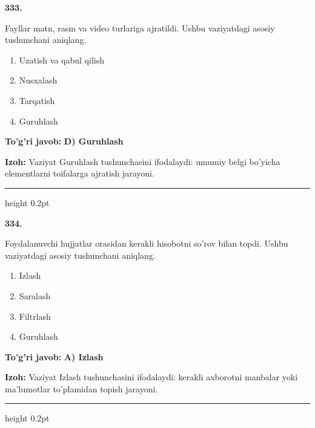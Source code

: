 \documentclass[10pt,a4paper,oneside]{article}
\begin{document}
\noindent\textbf{\color{ink}333.}
\par
Fayllar matn, rasm va video turlariga ajratildi. Ushbu vaziyatdagi asosiy tushunchani aniqlang.
\begin{enumerate}[label=\Alph*),leftmargin=9mm]
\item Uzatish va qabul qilish
\item Nusxalash
\item Tarqatish
\item Guruhlash
\end{enumerate}
\begin{tcolorbox}[enhanced,breakable,colback=teal!4,colframe=teal!50!black,boxrule=0.5pt,arc=1.1mm,left=3mm,right=3mm,top=1.7mm,bottom=1.7mm,before skip=2mm,after skip=2mm]
\textbf{\color{teal}To'g'ri javob:} \textbf{D) Guruhlash}
\par\smallskip
\textbf{Izoh:} Vaziyat Guruhlash tushunchasini ifodalaydi: umumiy belgi bo'yicha elementlarni toifalarga ajratish jarayoni.
\end{tcolorbox}
\vspace{2mm}\hrule height 0.2pt \vspace{3mm}

\noindent\textbf{\color{ink}334.}
\par
Foydalanuvchi hujjatlar orasidan kerakli hisobotni so'rov bilan topdi. Ushbu vaziyatdagi asosiy tushunchani aniqlang.
\begin{enumerate}[label=\Alph*),leftmargin=9mm]
\item Izlash
\item Saralash
\item Filtrlash
\item Guruhlash
\end{enumerate}
\begin{tcolorbox}[enhanced,breakable,colback=teal!4,colframe=teal!50!black,boxrule=0.5pt,arc=1.1mm,left=3mm,right=3mm,top=1.7mm,bottom=1.7mm,before skip=2mm,after skip=2mm]
\textbf{\color{teal}To'g'ri javob:} \textbf{A) Izlash}
\par\smallskip
\textbf{Izoh:} Vaziyat Izlash tushunchasini ifodalaydi: kerakli axborotni manbalar yoki ma'lumotlar to'plamidan topish jarayoni.
\end{tcolorbox}
\vspace{2mm}\hrule height 0.2pt \vspace{3mm}
\end{document}
